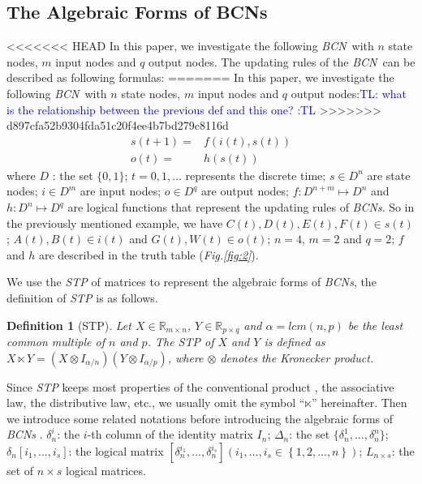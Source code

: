 \documentclass[conference]{IEEEtran} %
\newtheorem{definition}{Definition}
\def \BCN {{\em BCN}}
\newcommand{\tl}[1]{\textcolor{blue} {TL: #1 :TL} }
\begin{document}
\subsection{The Algebraic Forms of BCNs}
<<<<<<< HEAD
In this paper, we investigate the following \BCN\ with $n$ state nodes, $m$ input nodes and $q$ output nodes. The updating rules of the \BCN\ can be described as following formulas:
=======
In this paper, we investigate the following \BCN\ with $n$ state nodes, $m$ input nodes and $q$ output nodes:\tl{what is the relationship between the previous def and this one?}
>>>>>>> d897cfa52b9304fda51c20f4ee4b7bd279c8116d
\begin{equation}
\begin{split}
s(t+1)=&f(i(t),s(t))\\
o(t)=&h(s(t))
\end{split}
\label{equ:1}
\end{equation}
where $D$ : the set $\{0,1\}$; $t=0,1,...$ represents the discrete time; $s\in D^n$ are state nodes; $i\in D^m$ are input nodes; $o\in D^q$ are output nodes; $f:D^{n+m}\mapsto D^n$ and $h:D^n\mapsto D^q$ are logical functions that represent the updating rules of {\em BCNs}. So in the previously mentioned example, we have $C(t), D(t), E(t), F(t)\in s(t)$; $A(t), B(t)\in i(t)$ and $G(t), W(t)\in o(t)$; $n=4$, $m=2$ and $q=2$; $f$ and $h$ are described in the truth table ({\em Fig.\ref{fig:2}}). 

We use the {\em STP} of matrices to represent the algebraic forms of {\em BCNs}, the definition of {\em STP} is as follows.

\begin{definition}[STP] 
	\cite{Cheng2011Analysis} Let $X\in\mathbb{R}_{m\times n}$, $Y\in\mathbb{R}_{p\times q}$ and $\alpha=lcm(n,p)$ be the least common multiple of $n$ and $p$. The STP of $X$ and $Y$ is defined as $X\ltimes Y=(X\otimes I_{\alpha/n})(Y\otimes I_{\alpha/p})$, where $\otimes$ denotes the Kronecker product. 
\end{definition}

Since {\em STP} keeps most properties of the conventional product \cite{Cheng2011Analysis}, the associative law, the distributive law, etc., we usually omit the symbol ``$\ltimes$'' hereinafter. Then we introduce some related notations before introducing the algebraic forms of {\em BCNs} . $\delta^i_n$: the $i$-th column of the identity matrix $I_n$; $\Delta_n$: the set $\{\delta^1_n,...,\delta^n_n \}$; $\delta_n \left[i_1,...,i_s\right]$: the logical matrix $\left[\delta^{i_1}_n,...,\delta^{i_s}_n\right]\left(i_1,...,i_s\in\left\{1,2,...,n\right\}\right)$; $L_{n\times s}$: the set of $n\times s$ logical matrices. \cite{Zhang2016Observability}
\end{document}
